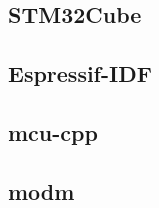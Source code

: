 \subsection{STM32Cube}


\subsection{Espressif-IDF}



\subsection{mcu-cpp}



\subsection{modm}


























